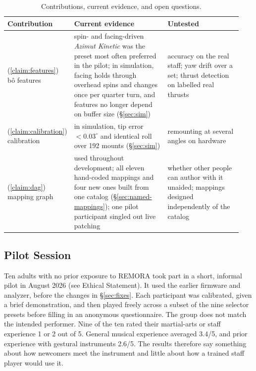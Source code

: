 \documentclass[sigconf,nonacm]{acmart}
\newcommand{\preset}[1]{\textit{#1}}
\begin{document}
\begin{table}[tbp]
\centering
\small
\caption{Contributions, current evidence, and open questions.}
\label{tab:claims-evidence}
\begin{tabular}{@{}>{\raggedright\arraybackslash}p{0.16\linewidth}>{\raggedright\arraybackslash}p{0.44\linewidth}>{\raggedright\arraybackslash}p{0.34\linewidth}@{}}
\toprule
Contribution & Current evidence & Untested \\
\midrule
(\ref{claim:features}) b\^o features & spin- and facing-driven \preset{Azimut Kinetic} was the preset most
often preferred in the pilot; in simulation, facing holds through overhead spins and changes once per
quarter turn, and features no longer depend on buffer size (\S\ref{sec:sim}) & accuracy on the real
staff; yaw drift over a set; thrust detection on labelled real thrusts \\
(\ref{claim:calibration}) calibration & in simulation, tip error $<0.03^\circ$ and identical roll over
192 mounts (\S\ref{sec:sim}) & remounting at several angles on hardware \\
(\ref{claim:dag}) mapping graph & used throughout development; all eleven hand-coded mappings and
four new ones built from one catalog (\S\ref{sec:named-mappings}); one pilot participant singled out
live patching & whether other people can author with it unaided; mappings designed independently of
the catalog \\
\bottomrule
\end{tabular}
\end{table}

\subsection{Pilot Session}
\label{sec:pilot}
Ten adults with no prior exposure to REMORA took part in a short, informal pilot in August 2026 (see
Ethical Statement). It used the earlier firmware and analyzer, before the changes in
\S\ref{sec:fixes}. Each participant was calibrated, given a brief demonstration, and then played
freely across a subset of the nine selector presets before filling in an anonymous questionnaire.
The group does not match the intended performer. Nine of the ten rated their martial-arts or staff
experience 1 or 2 out of 5. General musical experience averaged 3.4/5, and prior experience with
gestural instruments 2.6/5. The results therefore say something about how newcomers meet the
instrument and little about how a trained staff player would use it.
\end{document}
